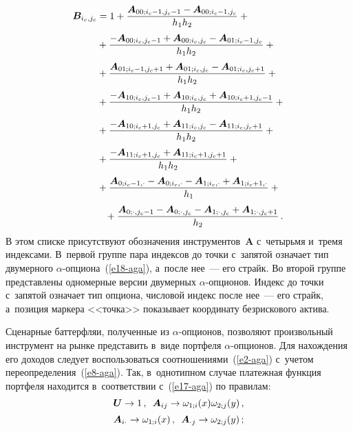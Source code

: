 \begin{multicols}{2}
 \noindent
  \begin{align*}
  \bm{B}_{i_c,j_c}& =1 + 
  \displaystyle\frac{\displaystyle \bm{A}_{00;i_c-1,j_c-1} - \bm{A}_{00;i_c-1,j_c}\mathstrut}{\displaystyle h_1h_2\mathstrut}+{}\\[2pt]
  &{}+\displaystyle\frac{\displaystyle  - \bm{A}_{00;i_c,j_c-1} + 
\bm{A}_{00;i_c,j_c} - \bm{A}_{01;i_c-1,j_c}\mathstrut}{\displaystyle h_1h_2\mathstrut} +{}\\[2pt]
&{}+ \displaystyle\frac{\displaystyle \bm{A}_{01;i_c-1,j_c+1} + \bm{A}_{01;i_c,j_c} - \bm{A}_{01;i_c,j_c+1}\mathstrut}{\displaystyle h_1h_2\mathstrut}+{}\\[2pt]
&{}+ \displaystyle\frac{\displaystyle  - \bm{A}_{10;i_c,j_c-1} + \bm{A}_{10;i_c,j_c} + \bm{A}_{10;i_c+1,j_c-1}\mathstrut}{\displaystyle h_1h_2\mathstrut}+{}\\[2pt]
&{}+ \displaystyle\frac{\displaystyle  -\bm{A}_{10;i_c+1,j_c} + \bm{A}_{11;i_c,j_c} - \bm{A}_{11;i_c,j_c+1}\mathstrut}{\displaystyle h_1h_2\mathstrut}+{}\\[2pt]
&{}+\displaystyle\frac{\displaystyle  - \bm{A}_{11;i_c+1,j_c} + \bm{A}_{11;i_c+1,j_c+1}\mathstrut}{\displaystyle h_1h_2\mathstrut} + {}\\[2pt]
&{}+\displaystyle\frac{\displaystyle \bm{A}_{0;i_c-1,\cdot} - \bm{A}_{0;i_c, \cdot} - \bm{A}_{1;i_c,\cdot} + \bm{A}_{1;i_c+1,\cdot}\mathstrut}{\displaystyle h_1\mathstrut} + {}\\[2pt]
&\hspace*{3mm}{}+\displaystyle\frac{\displaystyle \bm{A}_{0;\cdot,j_c-1} - \bm{A}_{0;\cdot,j_c} - \bm{A}_{1;\cdot,j_c} + \bm{A}_{1;\cdot,j_c+1}\mathstrut}{\displaystyle h_2\mathstrut}\,. 
  \end{align*}
  В этом списке присутствуют обозначения инструментов~$\bm{A}$ 
с~четырьмя и~тремя индексами. В~первой группе пара индексов до точки 
с~запятой означает тип двумерного $\alpha$-оп\-ци\-она~(\ref{e18-aga}), а~после 
нее~--- его страйк. Во второй группе представлены одномерные версии 
двумерных $\alpha$-оп\-ци\-онов. Индекс до точки с~запятой означает тип опциона, 
числовой индекс после нее~--- его страйк, а~позиция маркера <<точка>> 
показывает координату безрискового актива. 
  
  Сценарные баттерфляи, полученные из $\alpha$-оп\-ци\-онов, позволяют 
произвольный инструмент на рынке представить в~виде портфеля  
$\alpha$-оп\-ци\-онов. Для нахождения его доходов следует воспользоваться 
соотношениями~(\ref{e2-aga}) с~учетом переопределения~(\ref{e8-aga}). Так, 
в~однотипном случае платежная функция портфеля находится в~соответствии 
с~(\ref{e17-aga}) по правилам: 
  \begin{multline}
  \bm{U}\to 1\,,\enskip \bm{A}_{ij}\to \omega_{1;i}(x)\omega_{2;j}(y)\,,\\[2pt] 
\bm{A}_{i\cdot}\to \omega_{1;i}(x)\,,\enskip 
 \bm{A}_{\cdot j}\to \omega_{2;j}(y)\,;
  \label{e19-aga}
  \end{multline}
  
  \vspace*{-12pt}
  

\end{multicols}
